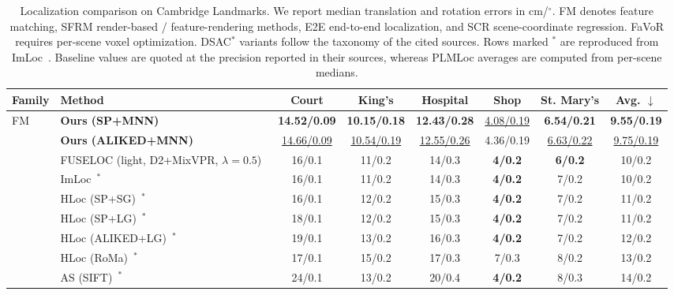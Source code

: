 \documentclass[letterpaper,10 pt,conference]{ieeeconf}
\newcommand{\method}{PLMLoc}
\begin{document}
\begin{table}[!t]
    \centering
    \caption{Localization comparison on Cambridge Landmarks. We report median translation and rotation errors in cm/$^\circ$. FM denotes feature matching, SFRM render-based / feature-rendering methods, E2E end-to-end localization, and SCR scene-coordinate regression. FaVoR requires per-scene voxel optimization. DSAC$^\ast$ variants follow the taxonomy of the cited sources. Rows marked $^\ast$ are reproduced from ImLoc~\cite{jiang2026imloc}. Baseline values are quoted at the precision reported in their sources, whereas \method{} averages are computed from per-scene medians.}
    \label{tab:cambridge-results}
    \setlength{\tabcolsep}{2.4pt}
    \begin{adjustbox}{max width=\textwidth}
    \begin{tabular}{@{}llcccccc@{}}
        \toprule
        Family & Method & Court & King's & Hospital & Shop & St. Mary's & Avg. $\downarrow$ \\
        \midrule
        \multirow{10}{*}{FM}
        & \textbf{Ours (SP+MNN)} & \textbf{14.52/0.09} & \textbf{10.15/0.18} & \textbf{12.43/0.28} & \underline{4.08/0.19} & \textbf{6.54/0.21} & \textbf{9.55/0.19} \\
        & \textbf{Ours (ALIKED+MNN)} & \underline{14.66/0.09} & \underline{10.54/0.19} & \underline{12.55/0.26} & 4.36/0.19 & \underline{6.63/0.22} & \underline{9.75/0.19} \\
        & FUSELOC (light, D2+MixVPR, $\lambda{=}0.5$)~\cite{nguyen2024fuseloc} & 16/0.1 & 11/0.2 & 14/0.3 & \textbf{4/0.2} & \textbf{6/0.2} & 10/0.2 \\
        & ImLoc~\cite{jiang2026imloc}$^\ast$ & 16/0.1 & 11/0.2 & 14/0.3 & \textbf{4/0.2} & 7/0.2 & 10/0.2 \\
        & HLoc (SP+SG)~\cite{sarlin2019hloc,sarlin2020superglue}$^\ast$ & 16/0.1 & 12/0.2 & 15/0.3 & \textbf{4/0.2} & 7/0.2 & 11/0.2 \\
        & HLoc (SP+LG)~\cite{sarlin2019hloc,lindenberger2023lightglue}$^\ast$ & 18/0.1 & 12/0.2 & 15/0.3 & \textbf{4/0.2} & 7/0.2 & 11/0.2 \\
        & HLoc (ALIKED+LG)~\cite{lindenberger2023lightglue,zhao2023aliked}$^\ast$ & 19/0.1 & 13/0.2 & 16/0.3 & \textbf{4/0.2} & 7/0.2 & 12/0.2 \\
        & HLoc (RoMa)~\cite{edstedt2024roma}$^\ast$ & 17/0.1 & 15/0.2 & 17/0.3 & 7/0.3 & 8/0.2 & 13/0.2 \\
        & AS (SIFT)~\cite{sattler2012active}$^\ast$ & 24/0.1 & 13/0.2 & 20/0.4 & \textbf{4/0.2} & 8/0.3 & 14/0.2 \\

\end{tabular}
\end{adjustbox}
\end{table}
\end{document}
